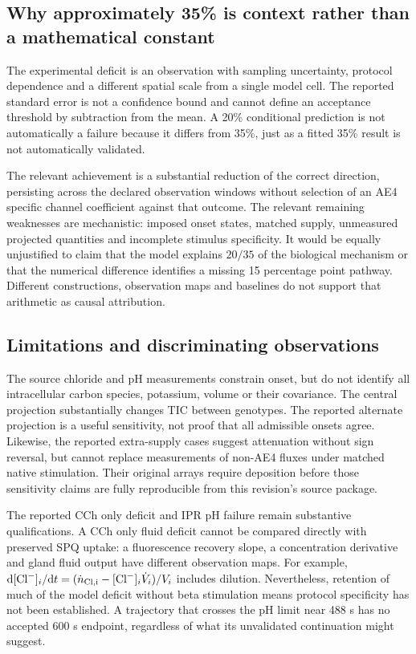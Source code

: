 \documentclass[11pt]{article}
\newcommand{\Cl}{\mathrm{Cl}^{-}}
\newcommand{\dd}{\mathrm{d}}
\begin{document}
\subsection{Why approximately 35\% is context rather than a mathematical constant}

The experimental deficit is an observation with sampling uncertainty, protocol dependence and a different spatial scale from a single model cell. The reported standard error is not a confidence bound and cannot define an acceptance threshold by subtraction from the mean. A 20\% conditional prediction is not automatically a failure because it differs from 35\%, just as a fitted 35\% result is not automatically validated.

The relevant achievement is a substantial reduction of the correct direction, persisting across the declared observation windows without selection of an AE4 specific channel coefficient against that outcome. The relevant remaining weaknesses are mechanistic: imposed onset states, matched supply, unmeasured projected quantities and incomplete stimulus specificity. It would be equally unjustified to claim that the model explains $20/35$ of the biological mechanism or that the numerical difference identifies a missing 15 percentage point pathway. Different constructions, observation maps and baselines do not support that arithmetic as causal attribution.

\subsection{Limitations and discriminating observations}

The source chloride and pH measurements constrain onset, but do not identify all intracellular carbon species, potassium, volume or their covariance. The central projection substantially changes TIC between genotypes. The reported alternate projection is a useful sensitivity, not proof that all admissible onsets agree. Likewise, the reported extra-supply cases suggest attenuation without sign reversal, but cannot replace measurements of non-AE4 fluxes under matched native stimulation. Their original arrays require deposition before those sensitivity claims are fully reproducible from this revision's source package.

The reported CCh only deficit and IPR pH failure remain substantive qualifications. A CCh only fluid deficit cannot be compared directly with preserved SPQ uptake: a fluorescence recovery slope, a concentration derivative and gland fluid output have different observation maps. For example, $\dd[\Cl]_i/\dd t=(\dot n_{\rm Cl,i}-[\Cl]_i\dot V_i)/V_i$ includes dilution. Nevertheless, retention of much of the model deficit without beta stimulation means protocol specificity has not been established. A trajectory that crosses the pH limit near 488 s has no accepted 600 s endpoint, regardless of what its unvalidated continuation might suggest.
\end{document}
